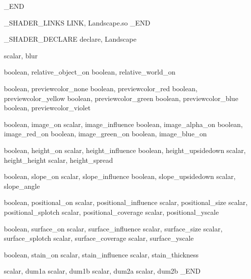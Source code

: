 _END


_SHADER_LINKS
LINK, Landscape.so
_END

_SHADER_DECLARE
declare,	Landscape

scalar,		blur

boolean,	relative_object_on
boolean,	relative_world_on

boolean,	previewcolor_none
boolean,	previewcolor_red
boolean,	previewcolor_yellow
boolean,	previewcolor_green
boolean,	previewcolor_blue
boolean,	previewcolor_violet

boolean,	image_on
scalar,		image_influence
boolean,	image_alpha_on
boolean,	image_red_on
boolean,	image_green_on
boolean,	image_blue_on

boolean,	height_on
scalar,		height_influence
boolean,	height_upsidedown
scalar,		height_height
scalar,		height_spread

boolean,	slope_on
scalar,		slope_influence
boolean,	slope_upsidedown
scalar,		slope_angle

boolean,	positional_on
scalar,		positional_influence
scalar,		positional_size
scalar,		positional_splotch
scalar,		positional_coverage
scalar,		positional_yscale

boolean,	surface_on
scalar,		surface_influence
scalar,		surface_size
scalar,		surface_splotch
scalar,		surface_coverage
scalar,		surface_yscale

boolean,	stain_on
scalar,		stain_influence
scalar,		stain_thickness

scalar,		dum1a
scalar,		dum1b
scalar,		dum2a
scalar,		dum2b
_END
